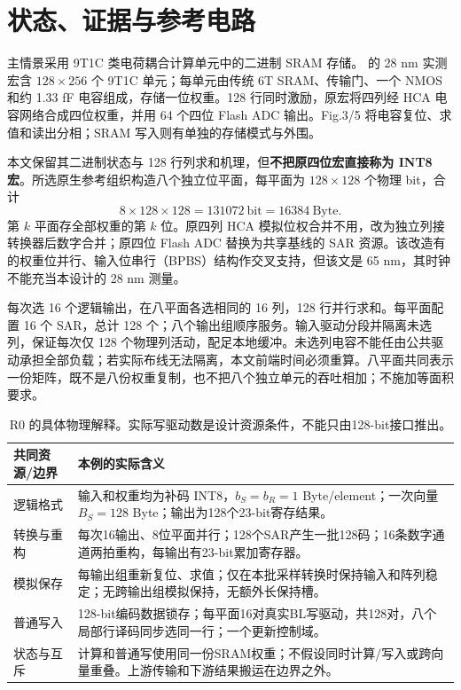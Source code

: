 \section{状态、证据与参考电路}

主情景采用 9T1C 类电荷耦合计算单元中的二进制 SRAM 存储。 的 28 nm 实测宏含 $128\times256$ 个 9T1C 单元；每单元由传统 6T SRAM、传输门、一个 NMOS 和约 1.33 fF 电容组成，存储一位权重。128 行同时激励，原宏将四列经 HCA 电容网络合成四位权重，并用 64 个四位 Flash ADC 输出。Fig.3/5 将电容复位、求值和读出分相；SRAM 写入则有单独的存储模式与外围。

本文保留其二进制状态与 128 行列求和机理，但\textbf{不把原四位宏直接称为 INT8 宏}。所选原生参考组织构造八个独立位平面，每平面为 $128\times128$ 个物理 bit，合计
\[
8\times128\times128=131072\ \mathrm{bit}=16384\ \mathrm{Byte}.
\]
第 $k$ 平面存全部权重的第 $k$ 位。原四列 HCA 模拟位权合并不用，改为独立列接转换器后数字合并；原四位 Flash ADC 替换为共享基线的 SAR 资源。该改造有  的权重位并行、输入位串行（BPBS）结构作交叉支持，但该文是 65 nm，其时钟不能充当本设计的 28 nm 测量。

每次选 16 个逻辑输出，在八平面各选相同的 16 列，128 行并行求和。每平面配置 16 个 SAR，总计 128 个；八个输出组顺序服务。输入驱动分段并隔离未选列，保证每次仅 128 个物理列活动，配足本地缓冲。未选列电容不能任由公共驱动承担全部负载；若实际布线无法隔离，本文前端时间必须重算。八平面共同表示一份矩阵，既不是八份权重复制，也不把八个独立单元的吞吐相加；不施加等面积要求。

\begin{table}[htbp]\centering\small
\begin{tabularx}{\textwidth}{@{}p{28mm}X@{}}\toprule
共同资源/边界 & 本例的实际含义\\\midrule
逻辑格式 & 输入和权重均为补码 INT8，$b_S=b_R=1$ Byte/element；一次向量 $B_S=128$ Byte；输出为128个23-bit寄存结果。\\
转换与重构 & 每次16输出、8位平面并行；128个SAR产生一批128码；16条数字通道两拍重构，每输出有23-bit累加寄存器。\\
模拟保存 & 每输出组重新复位、求值；仅在本批采样转换时保持输入和阵列稳定；无跨输出组模拟保持，无额外长保持槽。\\
普通写入 & 128-bit编码数据锁存；每平面16对真实BL写驱动，共128对，八个局部行译码同步选同一行；一个更新控制域。\\
状态与互斥 & 计算和普通写使用同一份SRAM权重；不假设同时计算/写入或跨向量重叠。上游传输和下游结果搬运在边界之外。\\\bottomrule
\end{tabularx}
\caption{R0 的具体物理解释。实际写驱动数是设计资源条件，不能只由128-bit接口推出。}
\end{table}

